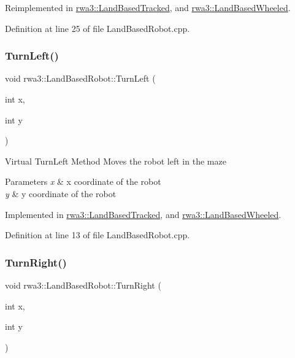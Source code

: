 Reimplemented in \hyperlink{classrwa3_1_1_land_based_tracked_a89dbcac8ec2fd64c6b168167cd6363a4}{rwa3\+::\+Land\+Based\+Tracked}, and \hyperlink{classrwa3_1_1_land_based_wheeled_af4bd6e50a4a6d30186c969add4d9c954}{rwa3\+::\+Land\+Based\+Wheeled}.



Definition at line 25 of file Land\+Based\+Robot.\+cpp.

\mbox{\label{classrwa3_1_1_land_based_robot_a9adfb103725320c1daff9ab72b0aad08}} 
\subsubsection{\texorpdfstring{Turn\+Left()}{TurnLeft()}}
{\footnotesize\ttfamily void rwa3\+::\+Land\+Based\+Robot\+::\+Turn\+Left (\begin{DoxyParamCaption}\item[{int}]{x,  }\item[{int}]{y }\end{DoxyParamCaption})\hspace{0.3cm}{\ttfamily [pure virtual]}}

Virtual Turn\+Left Method Moves the robot left in the maze 
\begin{DoxyParams}{Parameters}
{\em x} & x coordinate of the robot \\
\hline
{\em y} & y coordinate of the robot \\
\hline
\end{DoxyParams}


Implemented in \hyperlink{classrwa3_1_1_land_based_tracked_a6f8d74079ad047edd9f17cc541eafa86}{rwa3\+::\+Land\+Based\+Tracked}, and \hyperlink{classrwa3_1_1_land_based_wheeled_a5a659cca86a65e89156ef30ff363de41}{rwa3\+::\+Land\+Based\+Wheeled}.



Definition at line 13 of file Land\+Based\+Robot.\+cpp.

\mbox{\label{classrwa3_1_1_land_based_robot_ab62f4e787ae7f04dd9374b4f7e84985c}} 
\subsubsection{\texorpdfstring{Turn\+Right()}{TurnRight()}}
{\footnotesize\ttfamily void rwa3\+::\+Land\+Based\+Robot\+::\+Turn\+Right (\begin{DoxyParamCaption}\item[{int}]{x,  }\item[{int}]{y }\end{DoxyParamCaption})\hspace{0.3cm}{\ttfamily [pure virtual]}}

